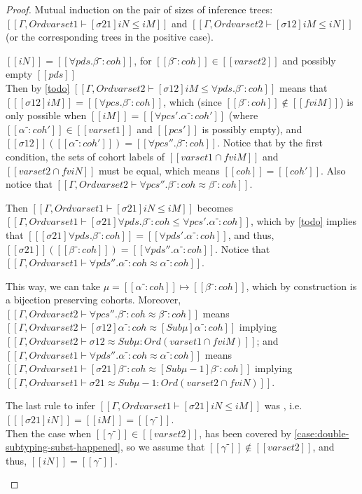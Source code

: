 \begin{proof}
  Mutual induction on the pair of sizes of inference trees: $[[Γ, Ord varset1 ⊢ [σ21]iN ≤ iM]]$
  and $[[Γ, Ord varset2 ⊢ [σ12]iM ≤ iN]]$ (or the corresponding trees in the
  positive case).

  \begin{caseof}
  \item $[[iN]] = [[∀pds.β⁻:coh]]$, for $[[β⁻:coh]] \in
    [[varset2]]$ and possibly empty $[[pds]]$\\
    \label{case:double-subtyping-subst-happened}
    Then by \cref{todo}  $[[Γ, Ord varset2 ⊢ [σ12]iM ≤ ∀pds.β⁻:coh]]$ means that $[[ [σ12]iM ]] =
    [[∀pcs.β⁻:coh]]$, which (since $[[β⁻:coh]] \notin [[fv iM]]$) is only possible
    when $[[iM]] = [[∀pcs'.α⁻:coh']]$ (where $[[α⁻:coh']] \in [[varset1]]$ and $[[pcs']]$ is possibly empty), and
    $[[σ12]] ([[α⁻:coh']]) = [[∀pcs''.β⁻:coh]]$.
    Notice that by the first condition, the sets of cohort labels of $[[varset1
    ∩ fv iM]]$ and $[[varset2 ∩ fv iN]]$ must be equal, which means $[[coh]] = [[coh']]$.
    Also notice that $[[Γ, Ord varset2 ⊢ ∀pcs''.β⁻:coh ≈ β⁻:coh]]$.

    Then $[[Γ, Ord varset1 ⊢ [σ21]iN ≤ iM]]$ becomes
    $[[Γ, Ord varset1 ⊢ [σ21]∀pds.β⁻:coh ≤ ∀pcs'.α⁻:coh]]$,
    which by \cref{todo}  implies that $[[ [σ21] ∀pds.β⁻:coh]] =
    [[∀pds'.α⁻:coh]]$, and thus,
    $[[σ21]] ([[β⁻:coh]]) = [[∀pds''.α⁻:coh]]$.
    Notice that $[[Γ, Ord varset1 ⊢ ∀pds''.α⁻:coh ≈ α⁻:coh]]$.

    This way, we can take $\mu = [[α⁻:coh]] \mapsto [[β⁻:coh]] $, which by
    construction is a bijection preserving cohorts. Moreover,
    $[[Γ, Ord varset2 ⊢ ∀pcs''.β⁻:coh ≈ β⁻:coh]]$ means
    $[[Γ, Ord varset2 ⊢ [σ12] α⁻:coh ≈ [Sub μ] α⁻:coh]]$ implying
    $[[Γ, Ord varset2 ⊢ σ12 ≈ Sub μ : Ord (varset1 ∩ fv iM) ]]$;
    and
    $[[Γ, Ord varset1 ⊢ ∀pds''.α⁻:coh ≈ α⁻:coh]]$ means
    $[[Γ, Ord varset1 ⊢ [σ21] β⁻:coh ≈ [Sub μ-1] β⁻:coh]]$ implying
    $[[Γ, Ord varset1 ⊢ σ21 ≈ Sub μ-1 : Ord (varset2 ∩ fv iN)]]$.

  \item The last rule to infer $[[Γ, Ord varset1 ⊢ [σ21]iN ≤ iM]]$ was
    , i.e. $[[ [σ21]iN ]] = [[iM]] = [[γ⁻]]$.\\
    Then the case when $[[γ⁻]] \in [[varset2]]$, has been covered by
    \cref{case:double-subtyping-subst-happened}, so we assume
    that $[[γ⁻]] \notin [[varset2]]$, and thus, $[[iN]] = [[γ⁻]]$.


\end{caseof}
\end{proof}
